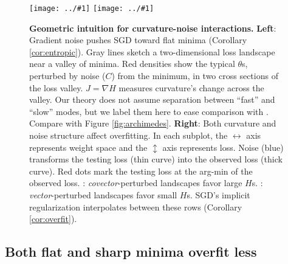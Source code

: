 \documentclass[anon,12pt]{colt2021} %
\newcommand{\offive}[1]{
    {\tiny
        \raisebox{-0.04cm}{\color{gray}\scalebox{2.5}{$\substack{
            \ifthenelse{\equal{#1}{0}}{{\color{moor}\blacksquare}}{\square} 
        }$}}%
        \raisebox{0.04cm}{$\substack{
            \IfSubStr{#1}{1}{{\color{moor}\blacksquare}}{\square}   
            \IfSubStr{#1}{1}{{\color{moor}\blacksquare}}{\square} \\
            \IfSubStr{#1}{2}{{\color{moor}\blacksquare}}{\square}    
            \IfSubStr{#1}{2}{{\color{moor}\blacksquare}}{\square}    
        }$}%
    }%
}
\newcommand{\plotmooh}[3]{\texttt{[image: ../\#1]}}
\begin{document}
            \begin{figure}[h!]
                \centering
                \plotmooh{colt/cubic}{}{0.35\columnwidth}
                \hfill  
                \plotmooh{colt/spring}{}{0.35\columnwidth}
                \caption{%
                    \textbf{Geometric intuition for curvature-noise interactions.}
                    \textbf{Left}:
                        Gradient noise pushes SGD toward flat minima
                        (Corollary
                        \ref{cor:entropic}).
                        Gray lines sketch a two-dimensional loss landscape near
                        a valley of minima.
                        Red densities show the 
                        typical $\theta$s, perturbed by noise ($C$) from the
                        minimum, in two cross sections of the
                        loss valley.  $J = \nabla H$ measures
                        curvature's change across the valley.  Our theory
                        does not assume separation between ``fast'' and
                        ``slow'' modes, but we label them here to
                        ease comparison with \cite{we19b}.
                        Compare with Figure \ref{fig:archimedes}.
                    \textbf{\bf Right}:
                        Both curvature and noise structure affect overfitting.
                        In each subplot, the  $\leftrightarrow$
                        axis represents weight space and the $\updownarrow$
                        axis represents loss.  Noise (blue) transforms
                        the testing loss (thin curve) into the observed loss
                        (thick curve).  Red dots mark the testing loss at the
                        arg-min of the observed loss.  \protect\offive{1}:
                        \emph{covector}-perturbed landscapes favor large $H$s.
                        \protect\offive{2}: \emph{vector}-perturbed landscapes
                        favor small $H$s.  SGD's implicit regularization
                        interpolates between these rows (Corollary
                        \ref{cor:overfit}).
                }
                \label{fig:cubicandspring}
            \end{figure}



        \subsection{Both flat and sharp minima overfit less}
            \label{subsect:curvature-and-overfitting}%
\end{document}

